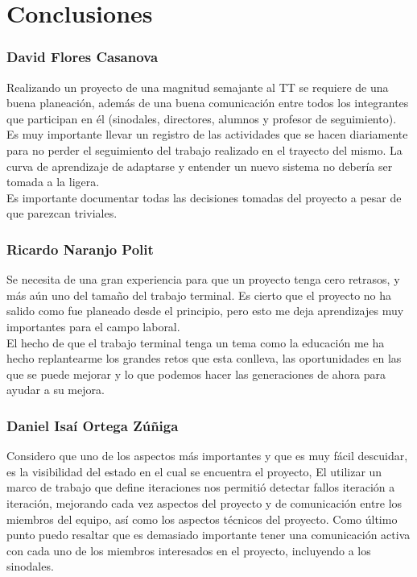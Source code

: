 \chapter{Conclusiones}

\subsection*{David Flores Casanova}

     Realizando un proyecto de una magnitud semajante al TT se requiere de una buena planeación, además de una buena comunicación entre todos los integrantes que participan en él (sinodales, directores, alumnos y profesor de seguimiento).\\
    
    \noindent Es muy importante llevar un registro de las actividades que se hacen diariamente para no perder el seguimiento del trabajo realizado en el trayecto del mismo. La curva de aprendizaje de adaptarse y entender un nuevo sistema no debería ser tomada a la ligera.\\
    
    \noindent Es importante documentar todas las decisiones tomadas del proyecto a pesar de que parezcan triviales. 
    
\subsection*{Ricardo Naranjo Polit}    
    
    Se necesita de una gran experiencia para que un proyecto tenga cero retrasos, y más aún uno del tamaño del trabajo terminal. Es cierto que el proyecto no ha salido como fue planeado desde el principio, pero esto me deja aprendizajes muy importantes para el campo laboral.\\
    
    \noindent El hecho de que el trabajo terminal tenga un tema como la educación me ha hecho replantearme los grandes retos que esta conlleva, las oportunidades en las que se puede mejorar y lo que podemos hacer las generaciones de ahora para ayudar a su mejora.
    
\clearpage
    
\subsection*{Daniel Isaí Ortega Zúñiga}

    Considero que uno de los aspectos más importantes y que es muy fácil descuidar, es la visibilidad del estado en el cual se encuentra el proyecto, El utilizar un marco de trabajo que define iteraciones nos permitió detectar fallos iteración a iteración, mejorando cada vez aspectos del proyecto y de comunicación entre los miembros del equipo, así como los aspectos técnicos del proyecto. Como último punto puedo resaltar que es demasiado importante tener una comunicación activa con cada uno de los miembros interesados en el proyecto, incluyendo a los sinodales.
